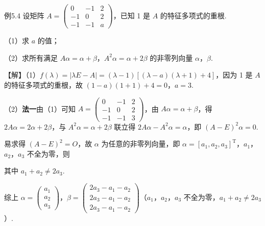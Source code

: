 \begin{fcard}{例5.4}
设矩阵 $A=\begin{pmatrix}0&-1&2\\-1&0&2\\-1&-1&a\end{pmatrix}$，已知 1 是 $A$ 的特征多项式的重根.

（1）求 $a$ 的值；

（2）求所有满足 $A\alpha=\alpha+\beta$，$A^{2}\alpha=\alpha+2\beta$ 的非零列向量 $\alpha$，$\beta$.%

【解】（1）$f(\lambda)=|\lambda E-A|=(\lambda-1)[(\lambda-a)(\lambda+1)+4]$，因为 1 是 $A$ 的特征多项式的重根，故 $(1-a)(1+1)+4=0$，$a=3$.

（2）\textbf{法一}\quad 由（1）可知 $A=\begin{pmatrix}0&-1&2\\-1&0&2\\-1&-1&3\end{pmatrix}$，由 $A\alpha=\alpha+\beta$，得 $2A\alpha=2\alpha+2\beta$，与 $A^{2}\alpha=\alpha+2\beta$ 联立得 $2A\alpha-A^{2}\alpha=\alpha$，即 $(A-E)^{2}\alpha=0$.

易求得 $(A-E)^{2}=O$，故 $\alpha$ 为任意的非零列向量，即 $\alpha=[a_1,a_2,a_3]^{\mathrm T}$，$a_1$，$a_2$，$a_3$ 不全为零，则


其中 $a_1+a_2\ne2a_3$.

综上 $\alpha=\begin{pmatrix}a_1\\a_2\\a_3\end{pmatrix}$，$\beta=\begin{pmatrix}2a_3-a_1-a_2\\2a_3-a_1-a_2\\2a_3-a_1-a_2\end{pmatrix}$（$a_1$，$a_2$，$a_3$ 不全为零，$a_1+a_2\ne2a_3$）.


\end{fcard}
